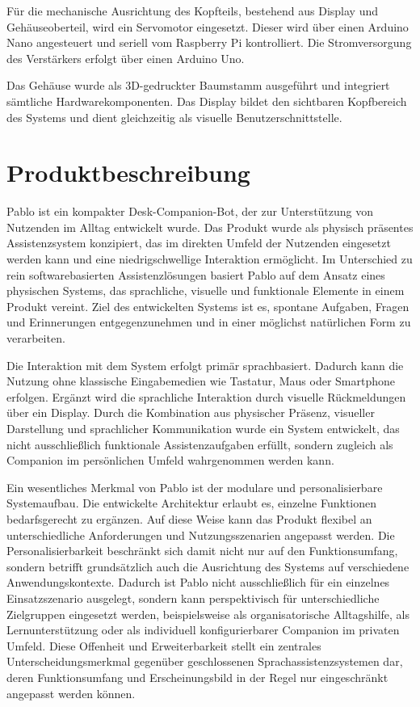 Für die mechanische Ausrichtung des Kopfteils, bestehend aus Display und Gehäuseoberteil, wird ein Servomotor eingesetzt. Dieser wird über einen Arduino Nano angesteuert und seriell vom Raspberry Pi kontrolliert. Die Stromversorgung des Verstärkers erfolgt über einen Arduino Uno.

Das Gehäuse wurde als 3D-gedruckter Baumstamm ausgeführt und integriert sämtliche Hardwarekomponenten. Das Display bildet den sichtbaren Kopfbereich des Systems und dient gleichzeitig als visuelle Benutzerschnittstelle.

\section{Produktbeschreibung}



Pablo ist ein kompakter Desk-Companion-Bot, der zur Unterstützung von Nutzenden im Alltag entwickelt wurde. 
Das Produkt wurde als physisch präsentes Assistenzsystem konzipiert, das im direkten Umfeld der Nutzenden eingesetzt werden kann und eine niedrigschwellige Interaktion ermöglicht. 
Im Unterschied zu rein softwarebasierten Assistenzlösungen basiert Pablo auf dem Ansatz eines physischen Systems, das sprachliche, visuelle und funktionale Elemente in einem Produkt vereint. 
Ziel des entwickelten Systems ist es, spontane Aufgaben, Fragen und Erinnerungen entgegenzunehmen und in einer möglichst natürlichen Form zu verarbeiten.

Die Interaktion mit dem System erfolgt primär sprachbasiert. 
Dadurch kann die Nutzung ohne klassische Eingabemedien wie Tastatur, Maus oder Smartphone erfolgen. 
Ergänzt wird die sprachliche Interaktion durch visuelle Rückmeldungen über ein Display.
Durch die Kombination aus physischer Präsenz, visueller Darstellung und sprachlicher Kommunikation wurde ein System entwickelt, das nicht ausschließlich funktionale Assistenzaufgaben erfüllt, sondern zugleich als Companion im persönlichen Umfeld wahrgenommen werden kann.

Ein wesentliches Merkmal von Pablo ist der modulare und personalisierbare Systemaufbau. 
Die entwickelte Architektur erlaubt es, einzelne Funktionen bedarfsgerecht zu ergänzen. 
Auf diese Weise kann das Produkt flexibel an unterschiedliche Anforderungen und Nutzungsszenarien angepasst werden. 
Die Personalisierbarkeit beschränkt sich damit nicht nur auf den Funktionsumfang, sondern betrifft grundsätzlich auch die Ausrichtung des Systems auf verschiedene Anwendungskontexte. 
Dadurch ist Pablo nicht ausschließlich für ein einzelnes Einsatzszenario ausgelegt, sondern kann perspektivisch für unterschiedliche Zielgruppen eingesetzt werden, beispielsweise als organisatorische Alltagshilfe, als Lernunterstützung oder als individuell konfigurierbarer Companion im privaten Umfeld. 
Diese Offenheit und Erweiterbarkeit stellt ein zentrales Unterscheidungsmerkmal gegenüber geschlossenen Sprachassistenzsystemen dar, deren Funktionsumfang und Erscheinungsbild in der Regel nur eingeschränkt angepasst werden können.



